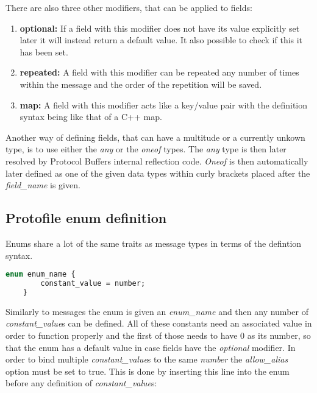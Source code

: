 There are also three other modifiers, that can be applied to fields:

\begin{enumerate}
    \item \textbf{optional:} If a field with this modifier does not have its value explicitly set later it will instead return a default value. It also possible to check if this it has been set.
    \item \textbf{repeated:} A field with this modifier can be repeated any number of times within the message and the order of the repetition will be saved.
    \item \textbf{map:} A field with this modifier acts like a key/value pair with the definition syntax being like that of a C++ map.
\end{enumerate}

Another way of defining fields, that can have a multitude or a currently unkown type, is to use either the \textit{any} or the \textit{oneof} types.
The \textit{any} type is then later resolved by Protocol Buffers internal reflection code.
\textit{Oneof} is then automatically later defined as one of the given data types within curly brackets placed after the \textit{field\_name} is given.

\subsection{Protofile enum definition}

Enums share a lot of the same traits as message types in terms of the defintion syntax.

\begin{minipage}{\textwidth}
\begin{lstlisting}[language=ProtoBuf, caption=Enum definition syntax in Protofiles]
    enum enum_name {
        constant_value = number;
    }
\end{lstlisting}
\end{minipage}

Similarly to messages the enum is given an \textit{enum\_name} and then any number of \textit{constant\_value}s can be defined. All of these constants need an associated
value in order to function properly and the first of those needs to have 0 as its number, so that the enum has a default value in case fields have the \textit{optional}
modifier. 
In order to bind multiple \textit{constant\_value}s to the same \textit{number} the \textit{allow\_alias} option must be set to true. This is done by inserting this line
into the enum before any definition of \textit{constant\_value}s:

